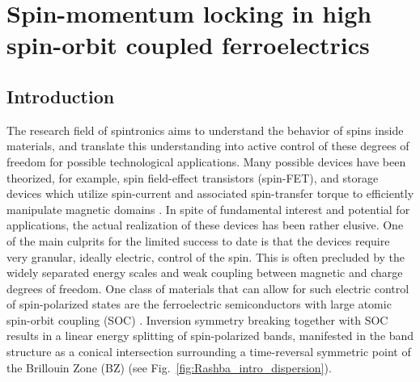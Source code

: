 \newcommand{\Unkr}{u_n(\bm{k}, \bm{r})}
\newcommand{\Eikr}{e^{i\bm{k}\cdot\bm{r}}}
\chapter{Spin-momentum locking in high spin-orbit coupled ferroelectrics \label{ch:Rashba}}
\section{Introduction}
%
The research field of spintronics aims to understand the behavior of spins inside materials, and translate this understanding into active control of these degrees of freedom for possible technological applications.
Many possible devices have been theorized, for example, spin field-effect transistors (spin-FET)\cite{Datta1990}, and storage devices which utilize spin-current and associated spin-transfer torque to efficiently manipulate magnetic domains \cite{Kent2015,Jungwirth2016}.
In spite of fundamental interest and potential for applications, the actual realization of these devices has been rather elusive.
One of the main culprits for the limited success to date is that the devices require very granular, ideally electric, control of the spin.
This is often precluded by the widely separated energy scales and weak coupling between magnetic and charge degrees of freedom.
One class of materials that can allow for such electric control of spin-polarized states are the ferroelectric semiconductors with large atomic spin-orbit coupling (SOC) \cite{DiSante2013,Ishizaka2011,Kim2014}.
Inversion symmetry breaking together with SOC results in a linear energy splitting of spin-polarized bands, manifested in the band structure as a conical intersection surrounding a time-reversal symmetric point of the Brillouin Zone (BZ) (see Fig.~\ref{fig:Rashba_intro_dispersion}).
